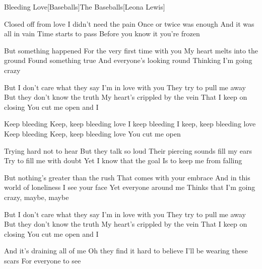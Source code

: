 \documentclass[a4paper,11pt,french]{article}
\begin{document}
\begin{Song}{Bleeding Love}[Baseballs]{The Baseballs}[Leona Lewis]
\begin{multicols}{2}
\begin{Verse}
Closed off from love
I didn't need the pain
Once or twice was enough
And it was all in vain
Time starts to pass
Before you know it you're frozen
\espaceInterStrophe

But something happened
For the very first time with you
My heart melts into the ground
Found something true
And everyone's looking round
Thinking I'm going crazy
\end{Verse}
\espaceInterStrophe

\begin{PreChorus}
But I don't care what they say
I'm in love with you
They try to pull me away
But they don't know the truth
My heart's crippled by the vein
That I keep on closing
You cut me open and I
\end{PreChorus}
\espaceInterStrophe

\begin{Chorus}
Keep bleeding
Keep, keep bleeding love
I keep bleeding
I keep, keep bleeding love
Keep bleeding
Keep, keep bleeding love
You cut me open
\end{Chorus}
\espaceInterStrophe

\begin{Verse}
Trying hard not to hear
But they talk so loud
Their piercing sounds fill my ears
Try to fill me with doubt
Yet I know that the goal
Is to keep me from falling
\columnbreak

But nothing's greater than the rush 
That comes with your embrace
And in this world of loneliness
I see your face
Yet everyone around me
Thinks that I'm going crazy, maybe, maybe
\end{Verse}
\espaceInterStrophe

\begin{PreChorus}
But I don't care what they say
I'm in love with you
They try to pull me away
But they don't know the truth
My heart's crippled by the vein
That I keep on closing
You cut me open and I
\end{PreChorus}
\espaceInterStrophe

\tochorus
\espaceInterStrophe

\begin{Bridge}
And it's draining all of me
Oh they find it hard to believe
I'll be wearing these scars
For everyone to see
\end{Bridge}
\espaceInterStrophe


\end{multicols}
\end{Song}
\end{document}
